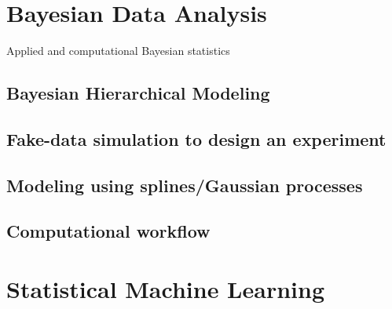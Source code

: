 \documentclass{article}
\begin{document}

\section{Bayesian Data Analysis}
Applied and computational Bayesian statistics
\subsection{Bayesian Hierarchical Modeling}
\subsection{Fake-data simulation to design an experiment}
\subsection{Modeling using splines/Gaussian processes}
\subsection{Computational workflow}

\section{Statistical Machine Learning}
\end{document}
